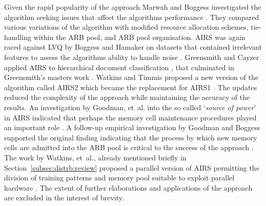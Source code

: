 Given the rapid popularity of the approach Marwah and Boggess investigated the algorithm seeking issues that affect the algorithms performance \cite{Marwah2002}. They compared various variations of the algorithm with modified resource allocation schemes, tie-handling within the ARB pool, and ARB pool organisation. AIRS was again raced against LVQ by Boggess and Hamaker on datasets that contained irrelevant features to assess the algorithms ability to handle noise \cite{Boggess2003}. Greensmith and Cayzer applied AIRS to hierarchical document classification \cite{Greensmith2003}, that culminated in Greensmith's masters work \cite{Greensmith2003a}. Watkins and Timmis proposed a new version of the algorithm called AIRS2 which became the replacement for AIRS1 \cite{Watkins2002b}. The updates reduced the complexity of the approach while maintaining the accuracy of the results. An investigation by Goodman, et~al. into the so called `\emph{source of power}' in AIRS indicated that perhaps the memory cell maintenance procedures played an important role \cite{Goodman2003}. A follow-up empirical investigation by Goodman and Boggess supported the original finding indicating that the process by which new memory cells are admitted into the ARB pool is critical to the success of the approach \cite{Goodman2004}.
The work by Watkins, et~al., already mentioned briefly in Section~\ref{subsec:distrb:review} proposed a parallel version of AIRS permitting the division of training patterns and memory pool suitable to exploit parallel hardware \cite{Watkins2004}. The extent of further elaborations and applications of the approach are excluded in the interest of brevity.

%
%

